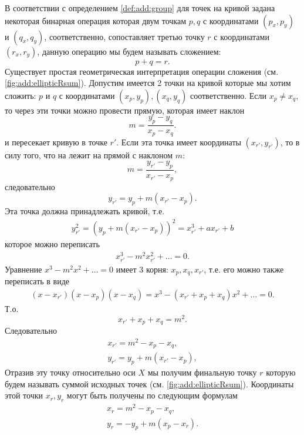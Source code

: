 В соответствии с определением \ref{def:add:group} для точек на кривой 
задана некоторая бинарная операция которая двум точкам $p, q$ с
координатами $(p_x, p_y)$ и $(q_x, q_y)$, соответственно, сопоставляет
третью точку $r$ с 
координатами $(r_x, r_y)$, данную операцию мы будем называть
сложением:
\[
p + q = r.
\]
Существует простая геометрическая интерпретация операции сложения (см.
\autoref{fig:add:ellipticRsum}). Допустим имеется 2 точки на кривой
которые мы хотим сложить: $p$ и $q$ с координатами $(x_p, y_p), (x_q,
y_q)$ соответственно. Если $x_p \ne x_q$, то через эти точки можно
провести прямую, которая имеет наклон 
\[
m = \frac{y_p - y_q}{x_p - x_q}.
\]
и пересекает кривую в точке $r'$. Если эта точка имеет координаты
$(x_{r'}, y_{r'})$, то в силу того, что на лежит на прямой с наклоном $m$:
\[
m = \frac{y_{r'} - y_p}{x_{r'} - x_p},
\]
следовательно
\[
y_{r'} = y_p + m \left(x_{r'} - x_p\right).
\]
Эта точка должна принадлежать кривой, т.е.
\begin{eqnarray}
y_{r'}^2 = \left(y_p + m \left(x_{r'} - x_p\right)\right)^2 = x_{r'}^3
+ a x_{r'} + b
\nonumber
\end{eqnarray}
которое можно переписать
\begin{eqnarray}
x_{r'}^3 - m^2 x_{r'}^2 + \dots = 0.
\nonumber
\end{eqnarray}
Уравнение $x^3 - m^2 x^2 + \dots = 0$ имеет 3 корня: $x_p, x_q,
x_{r'}$, т.е. его можно также переписать в виде
\begin{eqnarray}
(x - x_{r'})(x - x_p)(x - x_q) = x^3 - (x_{r'} + x_p + x_q) x^2 +
  \dots = 0.
\nonumber
\end{eqnarray}
Т.о. 
\[
x_{r'} + x_p + x_q = m^2.
\]
Следовательно
\begin{eqnarray}
x_{r'} = m^2 - x_p - x_q,
\nonumber \\
y_{r'} = y_p + m \left(x_{r'} - x_p\right),
\nonumber
\end{eqnarray}
Отразив эту точку относительно оси $X$ мы получим финальную точку $r$
которую будем называть суммой исходных точек  (см.
\autoref{fig:add:ellipticRsum}). Координаты этой точки $x_r, y_r$
могут быть получены по следующим формулам
\begin{eqnarray}
x_{r} = m^2 - x_p - x_q,
\nonumber \\
y_{r} = - y_p + m \left(x_p - x_r\right).
\label{eq:add:discretmath:elliptic:add}
\end{eqnarray}





